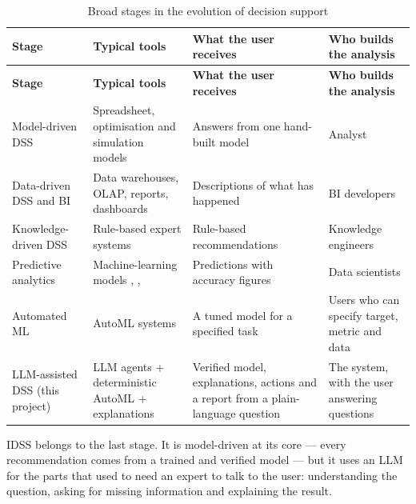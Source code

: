 \begingroup
\linespread{1}\small
\setlength{\tabcolsep}{4pt}
\begin{longtable}{|>{\raggedright\arraybackslash\hspace{0pt}}p{}|>{\raggedright\arraybackslash\hspace{0pt}}p{}|>{\raggedright\arraybackslash\hspace{0pt}}p{}|>{\raggedright\arraybackslash\hspace{0pt}}p{}|}
\caption{Broad stages in the evolution of decision support}\label{tab:2.1}\\
\hline
\rowcolor{tableheader}\textbf{Stage} & \textbf{Typical tools} & \textbf{What the user receives} & \textbf{Who builds the analysis} \\
\hline
\endfirsthead
\hline
\rowcolor{tableheader}\textbf{Stage} & \textbf{Typical tools} & \textbf{What the user receives} & \textbf{Who builds the analysis} \\
\endhead
Model-driven DSS & Spreadsheet, optimisation and simulation models & Answers from one hand-built model & Analyst \\ \hline
Data-driven DSS and BI & Data warehouses, OLAP, reports, dashboards & Descriptions of what has happened & BI developers \\ \hline
Knowledge-driven DSS & Rule-based expert systems & Rule-based recommendations & Knowledge engineers \\ \hline
Predictive analytics & Machine-learning models \cite{ref2}, \cite{ref3}, \cite{ref4} & Predictions with accuracy figures & Data scientists \\ \hline
Automated ML & AutoML systems \cite{ref5} & A tuned model for a specified task & Users who can specify target, metric and data \\ \hline
LLM-assisted DSS (this project) & LLM agents + deterministic AutoML + explanations & Verified model, explanations, actions and a report from a plain-language question & The system, with the user answering questions \\ \hline
\end{longtable}
\endgroup

IDSS belongs to the last stage. It is model-driven at its core --- every recommendation comes from a trained and verified model --- but it uses an LLM for the parts that used to need an expert to talk to the user: understanding the question, asking for missing information and explaining the result.

